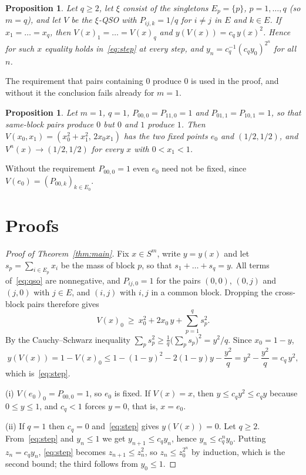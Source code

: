 \documentclass[11pt]{amsart}
\newtheorem{proposition}[theorem]{Proposition}
\theoremstyle{definition}
\theoremstyle{remark}
\numberwithin{equation}{section}
\begin{document}
\begin{proposition}\label{prop:sharp}
Let $q\ge2$, let $\xi$ consist of the singletons $E_p=\{p\}$, $p=1,\dots,q$ (so $m=q$), and let $V$ be the $\xi$-QSO with $P_{ij,k}=1/q$ for $i\neq j$ in $E$ and $k\in E$. If $x_1=\dots=x_q$, then $V(x)_1=\dots=V(x)_q$ and $y(V(x))=c_q\,y(x)^2$. Hence for such $x$ equality holds in~\eqref{eq:step} at every step, and $y_n=c_q^{-1}(c_qy_0)^{2^n}$ for all $n$.
\end{proposition}

The requirement that pairs containing $0$ produce $0$ is used in the proof, and without it the conclusion fails already for $m=1$.

\begin{proposition}\label{prop:zero}
Let $m=1$, $q=1$, $P_{00,0}=P_{11,0}=1$ and $P_{01,1}=P_{10,1}=1$, so that same-block pairs produce $0$ but $0$ and $1$ produce $1$. Then $V(x_0,x_1)=(x_0^2+x_1^2,\,2x_0x_1)$ has the two fixed points $e_0$ and $(1/2,1/2)$, and $V^n(x)\to(1/2,1/2)$ for every $x$ with $0<x_1<1$.
\end{proposition}

Without the requirement $P_{00,0}=1$ even $e_0$ need not be fixed, since $V(e_0)=(P_{00,k})_{k\in E_0}$.

\section{Proofs}

\begin{proof}[Proof of Theorem~\ref{thm:main}]
Fix $x\in S^m$, write $y=y(x)$ and let $s_p=\sum_{i\in E_p}x_i$ be the mass of block $p$, so that $s_1+\dots+s_q=y$. All terms of~\eqref{eq:qso} are nonnegative, and $P_{ij,0}=1$ for the pairs $(0,0)$, $(0,j)$ and $(j,0)$ with $j\in E$, and $(i,j)$ with $i,j$ in a common block. Dropping the cross-block pairs therefore gives
\[
V(x)_0\ \ge\ x_0^2+2x_0\,y+\sum_{p=1}^q s_p^2 .
\]
By the Cauchy--Schwarz inequality $\sum_p s_p^2\ge\frac1q\bigl(\sum_ps_p\bigr)^2=y^2/q$. Since $x_0=1-y$,
\[
y(V(x))=1-V(x)_0\le 1-(1-y)^2-2(1-y)y-\frac{y^2}{q}=y^2-\frac{y^2}q=c_q\,y^2,
\]
which is~\eqref{eq:step}.

(i) $V(e_0)_0=P_{00,0}=1$, so $e_0$ is fixed. If $V(x)=x$, then $y\le c_qy^2\le c_qy$ because $0\le y\le1$, and $c_q<1$ forces $y=0$, that is, $x=e_0$.

(ii) If $q=1$ then $c_q=0$ and~\eqref{eq:step} gives $y(V(x))=0$. Let $q\ge2$. From~\eqref{eq:step} and $y_n\le1$ we get $y_{n+1}\le c_qy_n$, hence $y_n\le c_q^ny_0$. Putting $z_n=c_qy_n$, \eqref{eq:step} becomes $z_{n+1}\le z_n^2$, so $z_n\le z_0^{2^n}$ by induction, which is the second bound; the third follows from $y_0\le1$.
\end{proof}
\end{document}
